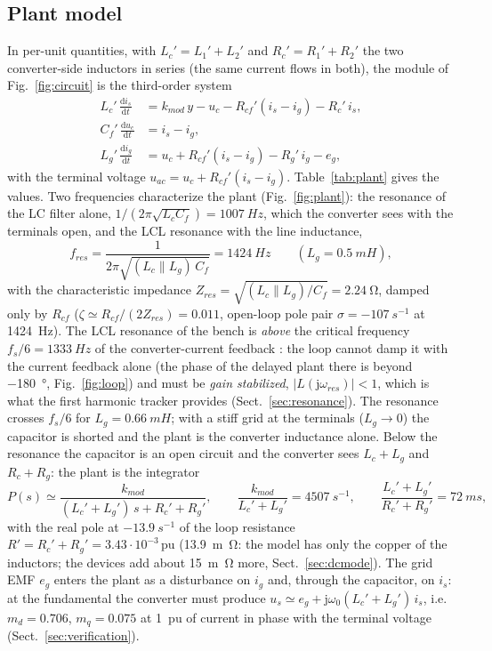 \documentclass[10pt,a4paper]{scrartcl}
\newcommand{\wo}{\omega_0}
\newcommand{\wres}{\omega_{res}}
\newcommand{\fres}{f_{res}}
\newcommand{\kmod}{k_{mod}}
\newcommand{\jj}{\mathrm{j}}
\newcommand{\dif}{\mathrm{d}}
\newcommand{\pu}{\,\mathrm{pu}}
\begin{document}
\begin{onehalfspace}
\subsection{Plant model}
\label{sec:plant}

In per-unit quantities, with $L_c' = L_1' + L_2'$ and $R_c' = R_1' + R_2'$ the two converter-side inductors in series (the same current flows in both), the module of Fig.~\ref{fig:circuit} is the third-order system
\begin{align}
L_c'\,\frac{\dif i_s}{\dif t} &= \kmod\,y - u_c - R_{cf}'(i_s - i_g) - R_c'\,i_s, \nonumber\\
C_f'\,\frac{\dif u_c}{\dif t} &= i_s - i_g, \label{eq:plant}\\
L_g'\,\frac{\dif i_g}{\dif t} &= u_c + R_{cf}'(i_s - i_g) - R_g'\,i_g - e_g, \nonumber
\end{align}
with the terminal voltage $u_{ac} = u_c + R_{cf}'(i_s - i_g)$. Table~\ref{tab:plant} gives the values. Two frequencies characterize the plant (Fig.~\ref{fig:plant}): the resonance of the LC filter alone, $1/(2\pi\sqrt{L_c C_f}) = \SI{1007}{Hz}$, which the converter sees with the terminals open, and the LCL resonance with the line inductance,
\begin{equation}
\fres = \frac{1}{2\pi\sqrt{(L_c \parallel L_g)\,C_f}} = \SI{1424}{Hz} \qquad (L_g = \SI{0.5}{mH}),
\label{eq:fres}
\end{equation}
with the characteristic impedance $Z_{res} = \sqrt{(L_c \parallel L_g)/C_f} = \SI{2.24}{\ohm}$, damped only by $R_{cf}$ ($\zeta \simeq R_{cf}/(2Z_{res}) = 0.011$, open-loop pole pair $\sigma = \SI{-107}{s^{-1}}$ at \SI{1424}{Hz}). The LCL resonance of the bench is \emph{above} the critical frequency $f_s/6 = \SI{1333}{Hz}$ of the converter-current feedback \cite{parker2014}: the loop cannot damp it with the current feedback alone (the phase of the delayed plant there is beyond \SI{-180}{\degree}, Fig.~\ref{fig:loop}) and must be \emph{gain stabilized}, $|L(\jj\wres)| < 1$, which is what the first harmonic tracker provides (Sect.~\ref{sec:resonance}). The resonance crosses $f_s/6$ for $L_g = \SI{0.66}{mH}$; with a stiff grid at the terminals ($L_g \to 0$) the capacitor is shorted and the plant is the converter inductance alone. Below the resonance the capacitor is an open circuit and the converter sees $L_c + L_g$ and $R_c + R_g$: the plant is the integrator
\begin{equation}
P(s) \simeq \frac{\kmod}{(L_c' + L_g')\,s + R_c' + R_g'}, \qquad \frac{\kmod}{L_c' + L_g'} = \SI{4507}{s^{-1}}, \qquad \frac{L_c' + L_g'}{R_c' + R_g'} = \SI{72}{ms},
\label{eq:plant_lf}
\end{equation}
with the real pole at $\SI{-13.9}{s^{-1}}$ of the loop resistance $R' = R_c' + R_g' = 3.43\cdot10^{-3}\pu$ (\SI{13.9}{m\ohm}: the model has only the copper of the inductors; the devices add about \SI{15}{m\ohm} more, Sect.~\ref{sec:dcmode}). The grid EMF $e_g$ enters the plant as a disturbance on $i_g$ and, through the capacitor, on $i_s$: at the fundamental the converter must produce $u_s \simeq e_g + \jj\wo(L_c' + L_g')\,i_s$, i.e. $m_d = 0.706$, $m_q = 0.075$ at \SI{1}{pu} of current in phase with the terminal voltage (Sect.~\ref{sec:verification}).


\end{onehalfspace}
\end{document}
